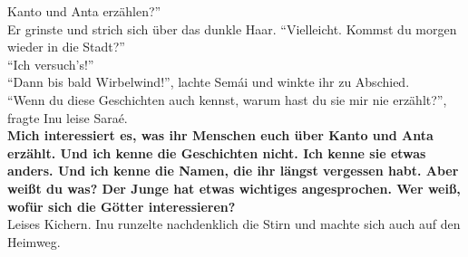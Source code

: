 Kanto und Anta erzählen?''\\
Er grinste und strich sich über das dunkle Haar. ``Vielleicht. Kommst du morgen wieder in die 
Stadt?''\\
``Ich versuch's!''\\
``Dann bis bald Wirbelwind!'', lachte Semái und winkte ihr zu Abschied.\\
``Wenn du diese Geschichten auch kennst, warum hast du sie mir nie erzählt?'', fragte Inu leise 
Saraé.\\
\textbf{Mich interessiert es, was ihr Menschen euch über Kanto und Anta erzählt. Und ich kenne die 
Geschichten nicht. Ich kenne sie etwas anders. Und ich kenne die Namen, die ihr längst vergessen 
habt. Aber weißt du was? Der Junge hat etwas wichtiges angesprochen. Wer weiß, wofür sich die 
Götter interessieren?}\\
Leises Kichern. Inu runzelte nachdenklich die Stirn und machte sich auch auf den Heimweg. \\

